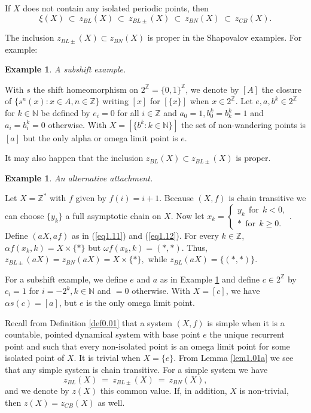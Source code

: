 \documentclass[12pt]{amsart}
\newtheorem{ex}[theo]{{\bfseries Example}}
\def \N {\mathbb N}
\def \Z {\mathbb Z}
\def \a {\alpha }
\def \om {\omega}
\numberwithin{equation}{section}
\begin{document}
If $X$ does not contain any isolated periodic points, then
\begin{equation}\label{eq3.02}
\xi(X) \ \subset \ z_{BL}(X)\ \subset \ z_{BL\pm}(X)\ \subset \ z_{BN}(X)\ \subset \ z_{CB}(X).
\end{equation}

The inclusion $z_{BL\pm}(X) \subset  z_{BN}(X)$ is proper in the Shapovalov examples.
For example:
\begin{ex}\label{ex3.01}A subshift example. \end{ex}

With $s$ the shift homeomorphism on $2^{\Z} = \{ 0, 1 \}^{\Z}$, we denote by $[A]$ the closure of $\{ s^n(x) : x \in A, n \in \Z \}$ writing
$[x]$ for $[\{ x \}]$ when $x \in 2^{\Z}$. Let $e, a, b^k \in 2^{\Z}$ for $k \in \N$ be defined by $e_i = 0$ for all $i \in \Z$ and
$a_0 = 1, b^k_0 = b^k_k = 1$ and $a_i = b^k_i = 0$ otherwise. With $X = [\{ b^k : k \in \N \}]$ the set of non-wandering points is $[a]$ but the
only alpha or omega limit point is $e$.\vspace{.25cm}




It may also happen that
the inclusion $z_{BL}(X) \subset  z_{BL\pm}(X)$ is proper. \vspace{.25cm}

\begin{ex}\label{ex3.02} An alternative attachment. \end{ex}

Let $X = \Z^*$ with $f$ given by $f(i) = i+1$. Because $(X,f)$ is chain transitive we can choose $\{ y_k \}$ a full asymptotic chain
on $X$.  Now let $x_k = \begin{cases} y_k \ \ \text{for} \ \ k < 0, \\ * \ \ \text{for} \ \ k \ge 0. \end{cases}$. Define
$(aX, af)$ as in (\ref{eq1.11}) and (\ref{eq1.12}). For every $k \in \Z$, $\a f(x_k,k) = X \times \{* \}$ but $\om f(x_k,k) = (*,*)$.
Thus, $z_{BL\pm}(aX) = z_{BN}(aX) = X \times \{ * \},$ while $ z_{BL}(aX) = \{ (*,*) \}$.

For a subshift example, we define $e$ and $a$ as in Example \ref{ex3.01} and define $c \in 2^{\Z}$ by $c_i = 1 $ for  $i = -2^k, k \in \N$ and
$= 0$ otherwise. With $X = [c]$, we have $\a s(c) = [a]$, but $e$ is the only omega limit point.
 \vspace{.25cm}

Recall from Definition \ref{def0.01} that a system $(X,f)$ is simple when it is a countable,  pointed dynamical system
with base point $e$ the unique recurrent point and such that every non-isolated point is an omega limit point for some isolated point of $X$.
It is trivial when $X = \{ e \}$. From Lemma \ref{lem1.01a} we see that any simple system is chain transitive. For a simple system we have
\begin{equation}\label{eq3.03}
 z_{BL}(X)\ = \ z_{BL\pm}(X)\ = \ z_{BN}(X), \hspace{2cm}
\end{equation}
and we denote by $z(X)$ this common value. If, in addition, $X$ is non-trivial, then $z(X) = z_{CB}(X)$ as well.\vspace{.25cm}
\end{document}
